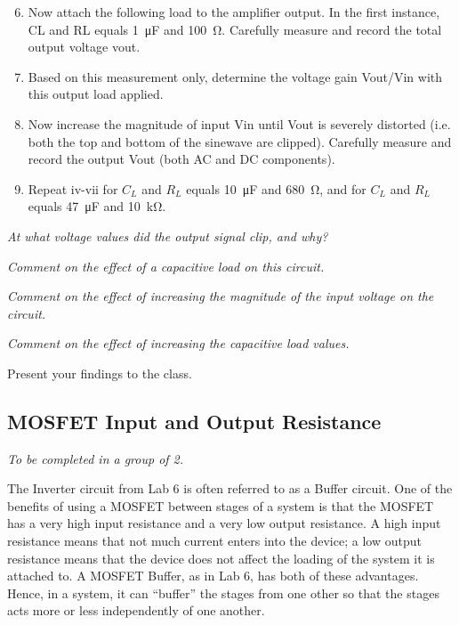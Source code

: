 \documentclass[12pt]{../manual}
\begin{document}
\begin{enumerate}
\setcounter{enumi}{5}
\item Now attach the following load to the amplifier output. In the first instance, CL and RL equals \SI{1}{\micro\F} and \SI{100}{\ohm}. Carefully measure and record the total output voltage vout.
\item Based on this measurement only, determine the voltage gain Vout/Vin with this output load applied.
\item Now increase the magnitude of input Vin until Vout is severely distorted (i.e. both the top and bottom of the sinewave are clipped). Carefully measure and record the output Vout (both AC and DC components).
\item Repeat iv-vii for $C_L$ and $R_L$ equals \SI{10}{\micro\F} and \SI{680}{\ohm}, and for $C_L$ and $R_L$ equals \SI{47}{\micro\F} and \SI{10}{\kilo\ohm}.
\end{enumerate}
{\it At what voltage values did the output signal clip, and why?}

{\it Comment on the effect of a capacitive load on this circuit.}

{\it Comment on the effect of increasing the magnitude of the input voltage on the circuit.}

{\it Comment on the effect of increasing the capacitive load values.}

Present your findings to the class.

\newpage
\subsection{MOSFET Input and Output Resistance}
\textit{To be completed in a group of 2.}

The Inverter circuit from Lab 6 is often referred to as a Buffer circuit. One of the benefits of using a MOSFET between stages of a system is that the MOSFET has a very high input resistance and a very low output resistance. A high input resistance means that not much current enters into the device; a low output resistance means that the device does not affect the loading of the system it is attached to. A MOSFET Buffer, as in Lab 6, has both of these advantages. Hence, in a system, it can ``buffer'' the stages from one other so that the stages acts more or less independently of one another.
\end{document}
